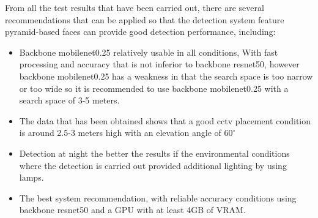 From all the test results that have been carried out, there are
several recommendations that can be applied so that the detection system 
feature pyramid-based faces can provide good detection performance, including:

\begin{itemize}
  \item Backbone mobilenet0.25 relatively usable in all conditions, With fast processing
  and accuracy that is not inferior to backbone resnet50, however backbone mobilenet0.25 has a weakness in that the search space is too narrow or too wide
  so it is recommended to use backbone mobilenet0.25 with a search space of 3-5 meters.
  \item The data that has been obtained shows that a good cctv placement condition is around 2.5-3 meters high with an elevation angle of $60^\circ$
  \item Detection at night the better the results if the environmental conditions where the detection is carried out
  provided additional lighting by using lamps.
  \item The best system recommendation, with reliable accuracy conditions using backbone resnet50 and a GPU with at least 4GB of VRAM.
\end{itemize}

